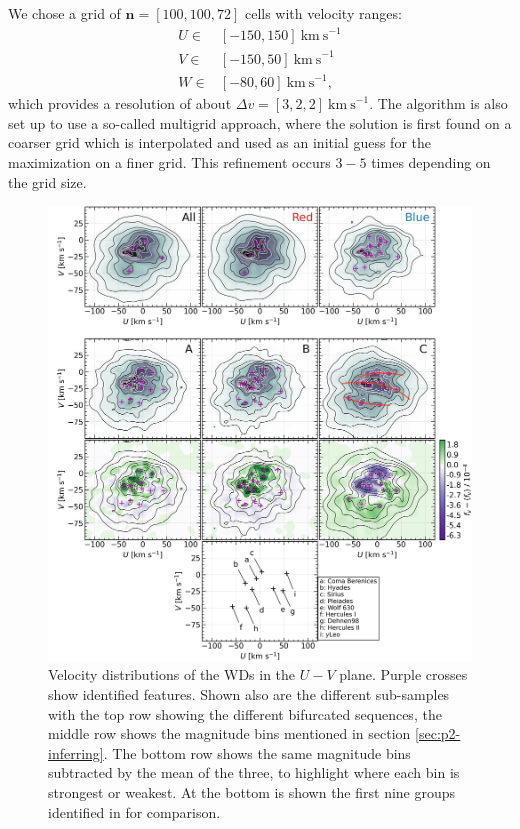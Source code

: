 We chose a grid of $\pmb{n} = [100, 100, 72]$ cells with velocity ranges:
\begin{align*}
    U \in& [-150, 150]\ \mathrm{km\ s}^{-1} \\
    V \in& [-150, 50]\ \mathrm{km\ s}^{-1} \\
    W \in& [-80, 60]\ \mathrm{km\ s}^{-1},
\end{align*}
which provides a resolution of about $\Delta v = [3, 2, 2]\ \mathrm{km\ s}^{-1}$. The algorithm is also set up to use a so-called multigrid approach, where the solution is first found on a coarser grid which is interpolated and used as an initial guess for the maximization on a finer grid. This refinement occurs $3-5$ times depending on the grid size. 
\begin{figure}[t!]
    \centering
    \vspace{-40pt}
    \includegraphics[width=1\textwidth]{images/wds_fv.jpg}
    \caption{Velocity distributions of the WDs in the $U-V$ plane. Purple crosses show identified features. Shown also are the different sub-samples with the top row showing the different bifurcated sequences, the middle row shows the magnitude bins mentioned in section \ref{sec:p2-inferring}. The bottom row shows the same magnitude bins subtracted by the mean of the three, to highlight where each bin is strongest or weakest. At the bottom is shown the first nine groups identified in \cite{antoja:12} for comparison.} %
    \label{fig:wd_fv}
\end{figure}
